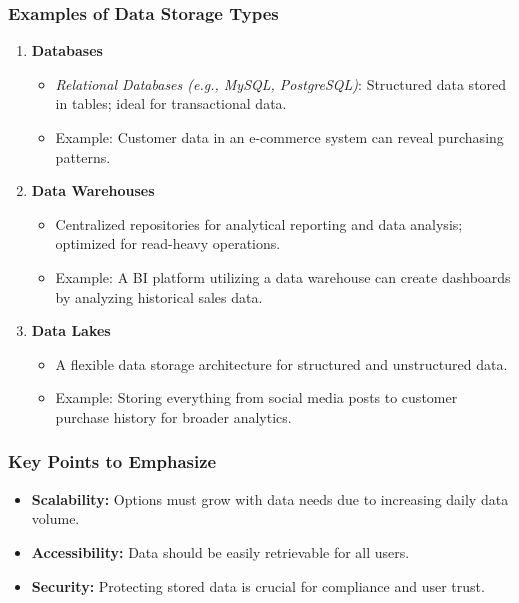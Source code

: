 \documentclass[aspectratio=169]{beamer}
\begin{document}
\begin{frame}[fragile]
    \frametitle{Examples of Data Storage Types}
    \begin{enumerate}
        \item \textbf{Databases}
            \begin{itemize}
                \item \textit{Relational Databases (e.g., MySQL, PostgreSQL)}: Structured data stored in tables; ideal for transactional data.
                \item Example: Customer data in an e-commerce system can reveal purchasing patterns.
            \end{itemize}
        
        \item \textbf{Data Warehouses}
            \begin{itemize}
                \item Centralized repositories for analytical reporting and data analysis; optimized for read-heavy operations.
                \item Example: A BI platform utilizing a data warehouse can create dashboards by analyzing historical sales data.
            \end{itemize}

        \item \textbf{Data Lakes}
            \begin{itemize}
                \item A flexible data storage architecture for structured and unstructured data.
                \item Example: Storing everything from social media posts to customer purchase history for broader analytics.
            \end{itemize}
    \end{enumerate}
\end{frame}

\begin{frame}[fragile]
    \frametitle{Key Points to Emphasize}
    \begin{itemize}
        \item \textbf{Scalability:} Options must grow with data needs due to increasing daily data volume.
        \item \textbf{Accessibility:} Data should be easily retrievable for all users.
        \item \textbf{Security:} Protecting stored data is crucial for compliance and user trust.
    \end{itemize}
\end{frame}
\end{document}

